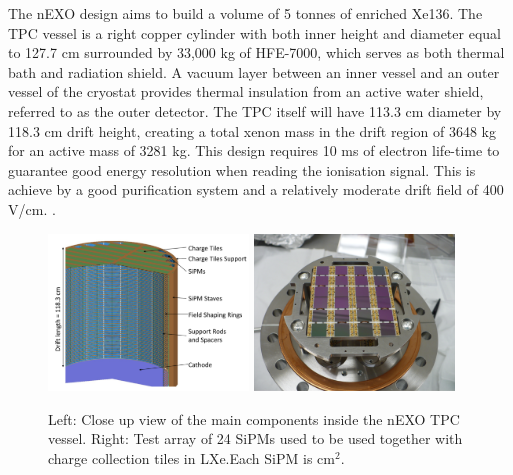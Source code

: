 The nEXO design aims to build a volume of 5 tonnes of enriched Xe136. The TPC vessel is a right copper cylinder with both inner height and diameter equal to 127.7 cm surrounded by 33,000 kg of HFE-7000, which serves as both thermal bath and radiation shield. A vacuum layer between an inner vessel and an outer vessel of the cryostat provides thermal insulation from an active water shield, referred to as the outer detector. The TPC itself will have 113.3 cm diameter by 118.3 cm drift height, creating a total xenon mass in the drift region of 3648 kg for an active mass of 3281 kg. This design requires 10 ms of electron life-time to guarantee good energy resolution when reading the ionisation signal. This is achieve by a good purification system and a relatively moderate drift field of 400 V/cm. \cite{nEXO:2021ujk}.



\begin{figure}[t!]
\begin{center}
\includegraphics[width=0.475\textwidth]{img/nexo_design}
\includegraphics[width=0.475\textwidth]{img/nexo_sipms}
\end{center}
\caption{Left: Close up view of the main components inside the nEXO TPC vessel. Right: Test array of 24 SiPMs used to be used together with charge collection tiles in LXe.Each SiPM is cm$^2$.} \label{fig:nexo}
\end{figure}

